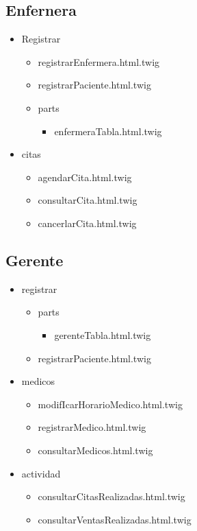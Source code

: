 		\subsection{Enfernera}
		\begin{itemize}
		\item Registrar
		\begin{itemize}
		\item registrarEnfermera.html.twig
		\item registrarPaciente.html.twig
		\item parts
			\begin{itemize}
				\item enfermeraTabla.html.twig
			\end{itemize}
		\end{itemize}
		\item citas 
			\begin{itemize}
				\item agendarCita.html.twig
				\item consultarCita.html.twig
				\item cancerlarCita.html.twig
			\end{itemize}
		\end{itemize}
		\subsection{Gerente}
		\begin{itemize}
			\item registrar
			\begin{itemize}
				\item parts 
				\begin{itemize}
				\item gerenteTabla.html.twig
				\end{itemize}
				\item registrarPaciente.html.twig
			\end{itemize}
			\item medicos 
			\begin{itemize}
			\item modifIcarHorarioMedico.html.twig
			\item registrarMedico.html.twig
			\item consultarMedicos.html.twig
			\end{itemize}
			\item actividad
			\begin{itemize}
				\item consultarCitasRealizadas.html.twig
				\item consultarVentasRealizadas.html.twig
			\end{itemize}
		\end{itemize}
